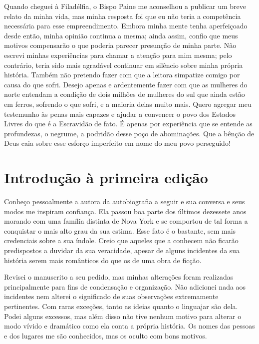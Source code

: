 Quando cheguei à Filadélfia, o Bispo
Paine me aconselhou a publicar um breve relato da minha vida, mas minha
resposta foi que eu não teria a competência necessária para esse
empreendimento. Embora minha mente tenha aperfeiçoado desde então, minha
opinião continua a mesma; ainda assim, confio que meus motivos
compensarão o que poderia parecer presunção de minha parte. Não escrevi
minhas experiências para chamar a atenção para mim mesma; pelo
contrário, teria sido mais agradável continuar em silêncio sobre minha
própria história. Também não pretendo fazer com que a leitora simpatize
comigo por causa do que sofri. Desejo apenas e ardentemente fazer com
que as mulheres do norte entendam a condição de dois milhões de mulheres
do sul que ainda estão em ferros, sofrendo o que sofri, e a maioria
delas muito mais. Quero agregar meu testemunho às penas mais capazes e
ajudar a convencer o povo dos Estados Livres do que é a Escravidão de
fato. É apenas por experiência que se entende as profundezas, o negrume,
a podridão desse poço de abominações. Que a bênção de Deus caia sobre
esse esforço imperfeito em nome do meu povo perseguido!

\chapter*{Introdução à primeira edição}

\begin{flushright}
\end{flushright}

Conheço pessoalmente a autora da
autobiografia a seguir e sua conversa e seus modos me inspiram
confiança. Ela passou boa parte
dos últimos dezessete anos morando com uma família distinta de Nova York
e se comportou de tal forma a conquistar o mais alto grau da sua estima.
Esse fato é o bastante, sem mais credenciais sobre a sua índole. Creio
que aqueles que a conhecem não ficarão predispostos a duvidar da sua
veracidade, apesar de alguns incidentes da sua história serem mais
românticos do que os de uma obra de ficção.

Revisei o manuscrito a seu pedido, mas
minhas alterações foram realizadas principalmente para fins de
condensação e organização. Não adicionei nada aos incidentes nem alterei
o significado de suas observações extremamente pertinentes. Com raras
exceções, tanto as ideias quanto o linguajar são dela. Podei alguns
excessos, mas além disso não tive nenhum motivo para alterar o modo
vívido e dramático como ela conta a própria história. Os nomes das
pessoas e dos lugares me são conhecidos, mas os oculto com bons motivos.

